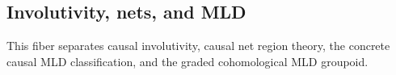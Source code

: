 \subsection{Involutivity, nets, and MLD}

This fiber separates causal involutivity, causal net region theory, the concrete causal MLD classification, and the graded cohomological MLD groupoid.





